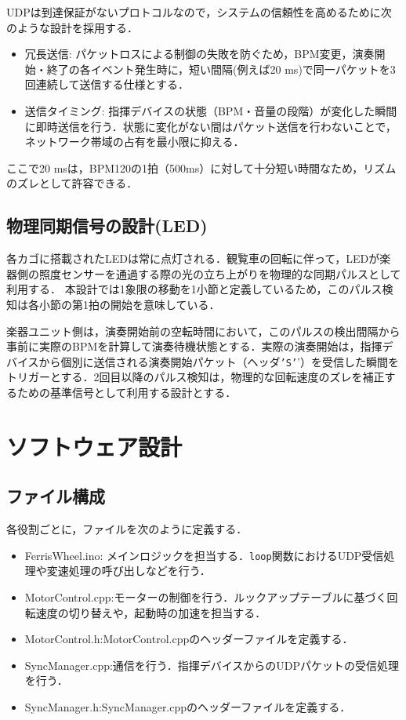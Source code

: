 \documentclass[uplatex,dvipdfmx]{jlreq}
\begin{document}
UDPは到達保証がないプロトコルなので，システムの信頼性を高めるために次のような設計を採用する．
\begin{itemize}
    \item 冗長送信: パケットロスによる制御の失敗を防ぐため，BPM変更，演奏開始・終了の各イベント発生時に，短い間隔(例えば20 ms)で同一パケットを3 回連続して送信する仕様とする．
    \item 送信タイミング: 指揮デバイスの状態（BPM・音量の段階）が変化した瞬間に即時送信を行う．状態に変化がない間はパケット送信を行わないことで，ネットワーク帯域の占有を最小限に抑える．
\end{itemize}
ここで20 msは，BPM120の1拍（500ms）に対して十分短い時間なため，リズムのズレとして許容できる．

\subsection{物理同期信号の設計(LED)}
各カゴに搭載されたLEDは常に点灯される．観覧車の回転に伴って，LEDが楽器側の照度センサーを通過する際の光の立ち上がりを物理的な同期パルスとして利用する．
本設計では1象限の移動を1小節と定義しているため，このパルス検知は各小節の第1拍の開始を意味している．

楽器ユニット側は，演奏開始前の空転時間において，このパルスの検出間隔から事前に実際のBPMを計算して演奏待機状態とする．実際の演奏開始は，指揮デバイスから個別に送信される演奏開始パケット（ヘッダ\texttt{'S'}'）を受信した瞬間をトリガーとする．2回目以降のパルス検知は，物理的な回転速度のズレを補正するための基準信号として利用する設計とする．

\section{ソフトウェア設計}
\subsection{ファイル構成}
各役割ごとに，ファイルを次のように定義する．
\begin{itemize}
    \item FerrisWheel.ino: メインロジックを担当する．\texttt{loop}関数におけるUDP受信処理や変速処理の呼び出しなどを行う．
    \item MotorControl.cpp:モーターの制御を行う．ルックアップテーブルに基づく回転速度の切り替えや，起動時の加速を担当する．
    \item MotorControl.h:MotorControl.cppのヘッダーファイルを定義する．
    \item SyncManager.cpp:通信を行う．指揮デバイスからのUDPパケットの受信処理を行う．
    \item SyncManager.h:SyncManager.cppのヘッダーファイルを定義する．
\end{itemize}
\end{document}
